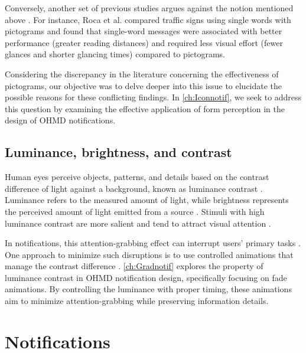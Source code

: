 Conversely, another set of previous studies argues against the notion mentioned above \cite{shinar_comprehension_2013, wiedenbeck_use_1999, theios_theoretical_1989, hameen_anttila_pictograms_2004}. For instance, Roca et al. \cite{roca_legibility_2018} compared traffic signs using single words with pictograms and found that single-word messages were associated with better performance (greater reading distances) and required less visual effort (fewer glances and shorter glancing times) compared to pictograms.

Considering the discrepancy in the literature concerning the effectiveness of pictograms, our objective was to delve deeper into this issue to elucidate the possible reasons for these conflicting findings. In \autoref{ch:Iconnotif}, we seek to address this question by examining the effective application of form perception in the design of OHMD notifications.


\subsection{Luminance, brightness, and contrast}
\label{sec:Relatedwork:liminance_brightness}
 
Human eyes perceive objects, patterns, and details based on the contrast difference of light against a background, known as luminance contrast \cite[Ch~3]{ware_information_2013}. Luminance refers to the measured amount of light, while brightness represents the perceived amount of light emitted from a source \cite[Ch~3]{ware_information_2013}. Stimuli with high luminance contrast are more salient and tend to attract visual attention \cite{lee_oxford_2013, mccay_peet_saliency_2012}.

In notifications, this attention-grabbing effect can interrupt users' primary tasks \cite{tasse_getting_2016, maglio_tradeoffs_2000, mccrickard_evaluating_2001}. One approach to minimize such disruptions is to use controlled animations that manage the contrast difference \cite{tasse_getting_2016, maglio_tradeoffs_2000}. \autoref{ch:Gradnotif} explores the property of luminance contrast in OHMD notification design, specifically focusing on fade animations. By controlling the luminance with proper timing, these animations aim to minimize attention-grabbing while preserving information details.








\section{Notifications}
\label{sec:Relatedwork:notifications}

